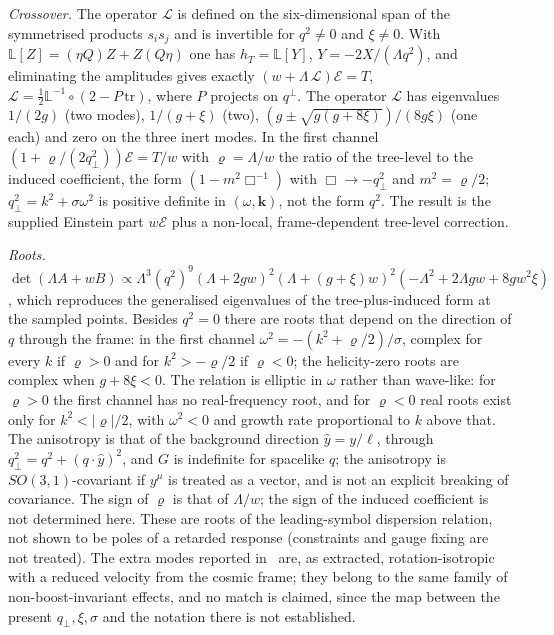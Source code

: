 \emph{Crossover.} The operator \(\mathcal L\) is defined on the six-dimensional span of the symmetrised products \(s_is_j\) and is invertible for \(q^2\neq0\) and \(\xi\neq0\). With \(\mathbb L[Z]=(\eta Q)Z+Z(Q\eta)\) one has \(h_T=\mathbb L[Y]\), \(Y=-2X/(\Lambda q^2)\), and eliminating the amplitudes gives exactly \((w+\Lambda\,\mathcal L)\mathcal E=T\), \(\mathcal L=\tfrac12\mathbb L^{-1}\circ(2-P\,\mathrm{tr})\), where \(P\) projects on \(q^\perp\). The operator \(\mathcal L\) has eigenvalues \(1/(2g)\) (two modes), \(1/(g+\xi)\) (two), \((g\pm\sqrt{g(g+8\xi)})/(8g\xi)\) (one each) and zero on the three inert modes. In the first channel \((1+\varrho/(2q_\perp^2))\mathcal E=T/w\) with \(\varrho=\Lambda/w\) the ratio of the tree-level to the induced coefficient, the form \((1-m^2\Box^{-1})\) with \(\Box\to-q_\perp^2\) and \(m^2=\varrho/2\); \(q_\perp^2=k^2+\sigma\omega^2\) is positive definite in \((\omega,\mathbf k)\), not the form \(q^2\). The result is the supplied Einstein part \(w\mathcal E\) plus a non-local, frame-dependent tree-level correction.



\emph{Roots.} \(\det(\Lambda A+wB)\propto\Lambda^3(q^2)^9(\Lambda+2gw)^2(\Lambda+(g+\xi)w)^2(-\Lambda^2+2\Lambda gw+8gw^2\xi)\), which reproduces the generalised eigenvalues of the tree-plus-induced form at the sampled points. Besides \(q^2=0\) there are roots that depend on the direction of \(q\) through the frame: in the first channel \(\omega^2=-(k^2+\varrho/2)/\sigma\), complex for every \(k\) if \(\varrho>0\) and for \(k^2>-\varrho/2\) if \(\varrho<0\); the helicity-zero roots are complex when \(g+8\xi<0\). The relation is elliptic in \(\omega\) rather than wave-like: for \(\varrho>0\) the first channel has no real-frequency root, and for \(\varrho<0\) real roots exist only for \(k^2<|\varrho|/2\), with \(\omega^2<0\) and growth rate proportional to \(k\) above that. The anisotropy is that of the background direction \(\hat y=y/\ell\), through \(q_\perp^2=q^2+(q\!\cdot\!\hat y)^2\), and \(G\) is indefinite for spacelike \(q\); the anisotropy is \(SO(3,1)\)-covariant if \(y^\mu\) is treated as a vector, and is not an explicit breaking of covariance. The sign of \(\varrho\) is that of \(\Lambda/w\); the sign of the induced coefficient is not determined here. These are roots of the leading-symbol dispersion relation, not shown to be poles of a retarded response (constraints and gauge fixing are not treated). The extra modes reported in~\cite{Steinacker2026} are, as extracted, rotation-isotropic with a reduced velocity from the cosmic frame; they belong to the same family of non-boost-invariant effects, and no match is claimed, since the map between the present \(q_\perp,\xi,\sigma\) and the notation there is not established.



